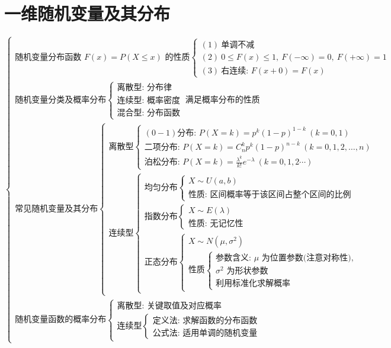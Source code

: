 \documentclass[lang=cn,11pt]{elegantbook}
\begin{document}
\chapter{一维随机变量及其分布}

{\small
\[
\begin{cases}
\text{随机变量分布函数 } F(x) = P(X \le x) \text{ 的性质}
\begin{cases}
(1)\ \text{单调不减} \\
(2)\ 0 \le F(x) \le 1,\ F(-\infty)=0,\ F(+\infty)=1 \\
(3)\ \text{右连续: } F(x+0) = F(x)
\end{cases} \\[1em]
\text{随机变量分类及概率分布}
\begin{cases}
\text{离散型: 分布律} \\
\text{连续型: 概率密度} \\
\text{混合型: 分布函数}
\end{cases}
\ \text{满足概率分布的性质} \\[1em]
\text{常见随机变量及其分布}
\begin{cases}
\text{离散型}
\begin{cases}
(0-1)\text{分布: } P(X=k) = p^k(1-p)^{1-k}\ (k=0,1) \\
\text{二项分布: } P(X=k) = C_n^k p^k(1-p)^{n-k}\ (k=0,1,2,\dots,n) \\
\text{泊松分布: } P(X=k) = \frac{\lambda^k}{k!}e^{-\lambda}\ (k=0,1,2\cdots)
\end{cases} \\[2em]
\text{连续型}
\begin{cases}
\text{均匀分布}
\begin{cases}
X \sim U(a,b) \\
\text{性质: 区间概率等于该区间占整个区间的比例}
\end{cases} \\
\text{指数分布}
\begin{cases}
X \sim E(\lambda) \\
\text{性质: 无记忆性}
\end{cases} \\
\text{正态分布}
\begin{cases}
X \sim N(\mu,\sigma^2) \\
\text{性质}
\begin{cases}
\text{参数含义: } \mu \text{ 为位置参数(注意对称性),} \\
\sigma^2 \text{ 为形状参数} \\
\text{利用标准化求解概率}
\end{cases}
\end{cases}
\end{cases}
\end{cases} \\[1em]
\text{随机变量函数的概率分布}
\begin{cases}
\text{离散型: 关键取值及对应概率} \\
\text{连续型}
\begin{cases}
\text{定义法: 求解函数的分布函数} \\
\text{公式法: 适用单调的随机变量}
\end{cases}
\end{cases}
\end{cases}
\]
}
\end{document}
